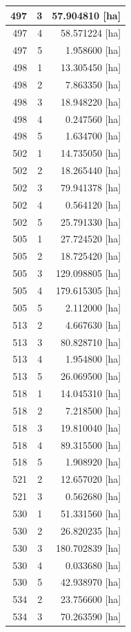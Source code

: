\documentclass[11pt,]{book}
\begin{document}
\begin{table}
\begin{tabular}[t]{r|r|r}
\hline
497 & 3 & 57.904810 [ha]\\
\hline
497 & 4 & 58.571224 [ha]\\
\hline
497 & 5 & 1.958600 [ha]\\
\hline
498 & 1 & 13.305450 [ha]\\
\hline
498 & 2 & 7.863350 [ha]\\
\hline
498 & 3 & 18.948220 [ha]\\
\hline
498 & 4 & 0.247560 [ha]\\
\hline
498 & 5 & 1.634700 [ha]\\
\hline
502 & 1 & 14.735050 [ha]\\
\hline
502 & 2 & 18.265440 [ha]\\
\hline
502 & 3 & 79.941378 [ha]\\
\hline
502 & 4 & 0.564120 [ha]\\
\hline
502 & 5 & 25.791330 [ha]\\
\hline
505 & 1 & 27.724520 [ha]\\
\hline
505 & 2 & 18.725420 [ha]\\
\hline
505 & 3 & 129.098805 [ha]\\
\hline
505 & 4 & 179.615305 [ha]\\
\hline
505 & 5 & 2.112000 [ha]\\
\hline
513 & 2 & 4.667630 [ha]\\
\hline
513 & 3 & 80.828710 [ha]\\
\hline
513 & 4 & 1.954800 [ha]\\
\hline
513 & 5 & 26.069500 [ha]\\
\hline
518 & 1 & 14.045310 [ha]\\
\hline
518 & 2 & 7.218500 [ha]\\
\hline
518 & 3 & 19.810040 [ha]\\
\hline
518 & 4 & 89.315500 [ha]\\
\hline
518 & 5 & 1.908920 [ha]\\
\hline
521 & 2 & 12.657020 [ha]\\
\hline
521 & 3 & 0.562680 [ha]\\
\hline
530 & 1 & 51.331560 [ha]\\
\hline
530 & 2 & 26.820235 [ha]\\
\hline
530 & 3 & 180.702839 [ha]\\
\hline
530 & 4 & 0.033680 [ha]\\
\hline
530 & 5 & 42.938970 [ha]\\
\hline
534 & 2 & 23.756600 [ha]\\
\hline
534 & 3 & 70.263590 [ha]\\

\end{tabular}
\end{table}
\end{document}
